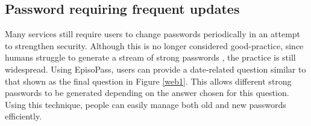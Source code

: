 \documentclass[runningheads,a4paper]{llncs}
\begin{document}
\subsection{Password requiring frequent updates}

Many services still require users to change passwords periodically in an attempt
to strengthen security.
%
Although this is no longer considered good-practice, since humans struggle to
generate a stream of strong passwords \cite{Schneier:change}, the practice is
still widespread.
%
%
Using EpisoPass, users can provide a date-related question
similar to that shown as the final question in Figure \ref{web1}. This allows
different strong passwords to be generated depending on the answer chosen
for this question. Using this technique, people can easily manage both old and new 
passwords efficiently.

% 
% 
% 
\end{document}
